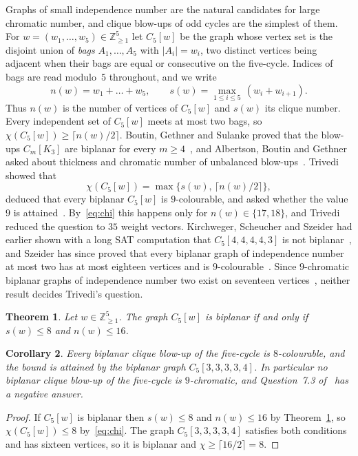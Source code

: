 \documentclass[11pt]{amsart}
\newtheorem{theorem}{Theorem}[section]
\newtheorem{corollary}[theorem]{Corollary}
\theoremstyle{definition}
\theoremstyle{remark}
\numberwithin{equation}{section}
\newcommand{\Z}{\mathbb{Z}}
\newcommand{\cw}{C_5[w]}
\begin{document}
Graphs of small independence number are the natural candidates for large chromatic number, and clique blow-ups of odd cycles are the simplest of them. For $w=(w_1,\dots,w_5)\in\Z_{\ge1}^5$ let $\cw$ be the graph whose vertex set is the disjoint union of \emph{bags} $A_1,\dots,A_5$ with $|A_i|=w_i$, two distinct vertices being adjacent when their bags are equal or consecutive on the five-cycle. Indices of bags are read modulo~$5$ throughout, and we write
\[
n(w)=w_1+\dots+w_5,\qquad s(w)=\max_{1\le i\le5}\,(w_i+w_{i+1}).
\]
Thus $n(w)$ is the number of vertices of $\cw$ and $s(w)$ its clique number. Every independent set of $\cw$ meets at most two bags, so $\chi(\cw)\ge\lceil n(w)/2\rceil$. Boutin, Gethner and Sulanke proved that the blow-ups $C_m[K_3]$ are biplanar for every $m\ge4$~\cite{BGS}, and Albertson, Boutin and Gethner asked about thickness and chromatic number of unbalanced blow-ups~\cite{ABG}. Trivedi~\cite{Tr} showed that
\begin{equation}\label{eq:chi}
\chi(\cw)=\max\bigl\{s(w),\,\lceil n(w)/2\rceil\bigr\},
\end{equation}
deduced that every biplanar $\cw$ is $9$-colourable, and asked whether the value $9$ is attained~\cite[Question~7.3]{Tr}. By~\eqref{eq:chi} this happens only for $n(w)\in\{17,18\}$, and Trivedi reduced the question to $35$ weight vectors. Kirchweger, Scheucher and Szeider had earlier shown with a long SAT computation that $C_5[4,4,4,4,3]$ is not biplanar~\cite{KSS}, and Szeider has since proved that every biplanar graph of independence number at most two has at most eighteen vertices and is $9$-colourable~\cite{Sz}. Since $9$-chromatic biplanar graphs of independence number two exist on seventeen vertices~\cite{GS}, neither result decides Trivedi's question.

\begin{theorem}\label{thm:main}
Let $w\in\Z_{\ge1}^5$. The graph $\cw$ is biplanar if and only if $s(w)\le8$ and $n(w)\le16$.
\end{theorem}

\begin{corollary}\label{cor:chi}
Every biplanar clique blow-up of the five-cycle is $8$-colourable, and the bound is attained by the biplanar graph $C_5[3,3,3,3,4]$. In particular no biplanar clique blow-up of the five-cycle is $9$-chromatic, and Question~7.3 of~\cite{Tr} has a negative answer.
\end{corollary}

\begin{proof}
If $\cw$ is biplanar then $s(w)\le8$ and $n(w)\le16$ by Theorem~\ref{thm:main}, so $\chi(\cw)\le8$ by~\eqref{eq:chi}. The graph $C_5[3,3,3,3,4]$ satisfies both conditions and has sixteen vertices, so it is biplanar and $\chi\ge\lceil 16/2\rceil=8$.
\end{proof}
\end{document}
